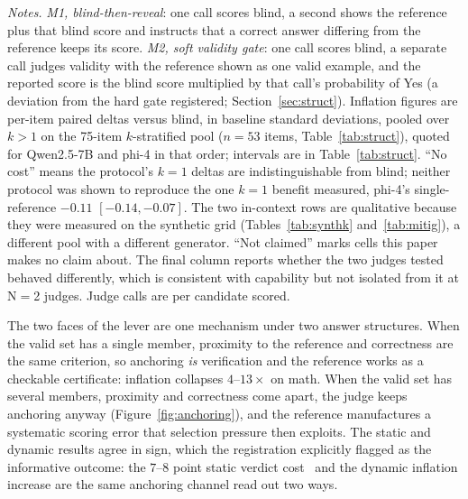 \documentclass[11pt]{article}
\begin{document}
\begin{table}[tbp]
\medskip
\begin{minipage}{0.97\textwidth}
\footnotesize
\emph{Notes.}
\emph{M1, blind-then-reveal}: one call scores blind, a second shows the reference plus that blind score and instructs that a correct answer differing from the reference keeps its score.
\emph{M2, soft validity gate}: one call scores blind, a separate call judges validity with the reference shown as one valid example, and the reported score is the blind score multiplied by that call's probability of Yes (a deviation from the hard gate registered; Section~\ref{sec:struct}).
Inflation figures are per-item paired deltas versus blind, in baseline standard deviations, pooled over $k > 1$ on the 75-item $k$-stratified pool ($n{=}53$ items, Table~\ref{tab:struct}), quoted for Qwen2.5-7B and phi-4 in that order; intervals are in Table~\ref{tab:struct}.
``No cost'' means the protocol's $k{=}1$ deltas are indistinguishable from blind; neither protocol was shown to reproduce the one $k{=}1$ benefit measured, phi-4's single-reference $-0.11$ $[-0.14, -0.07]$.
The two in-context rows are qualitative because they were measured on the synthetic grid (Tables~\ref{tab:synthk} and~\ref{tab:mitig}), a different pool with a different generator.
``Not claimed'' marks cells this paper makes no claim about.
The final column reports whether the two judges tested behaved differently, which is consistent with capability but not isolated from it at N$=$2 judges.
Judge calls are per candidate scored.
\end{minipage}
\caption{\textbf{Takeaway: score blind first and reveal the reference only to correct demonstrated errors (M1). Of the protocols tested, it is the only one that keeps a reference in the loop, removes the measured inflation when several answers are valid, costs nothing when the answer is unique, and behaves the same for both judges tested. The price is one extra judge call per candidate.}
What to do about a reference answer, by task structure.}
\label{tab:rule}
\end{table}

The two faces of the lever are one mechanism under two answer structures.
When the valid set has a single member, proximity to the reference and correctness are the same criterion, so anchoring \emph{is} verification and the reference works as a checkable certificate: inflation collapses $4$--$13\times$ on math.
When the valid set has several members, proximity and correctness come apart, the judge keeps anchoring anyway (Figure~\ref{fig:anchoring}), and the reference manufactures a systematic scoring error that selection pressure then exploits.
The static and dynamic results agree in sign, which the registration explicitly flagged as the informative outcome: the $7$--$8$ point static verdict cost~\cite{companionA} and the dynamic inflation increase are the same anchoring channel read out two ways.
\end{document}
